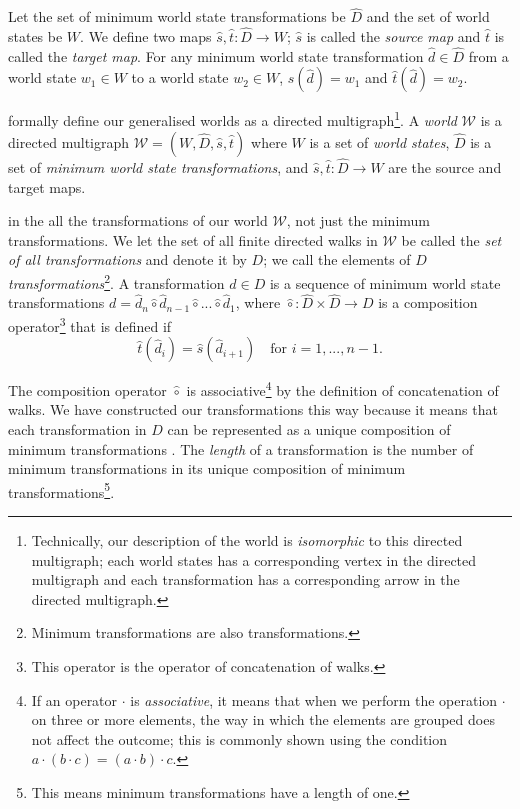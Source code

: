 Let the set of minimum world state transformations be $\hat{D}$ and the set of world states be $W$.
We define two maps $\hat{s},\hat{t}: \hat{D} \to W$; $\hat{s}$ is called the \emph{source map} and $\hat{t}$ is called the \emph{target map}.
For any minimum world state transformation $\hat{d} \in \hat{D}$ from a world state $w_{1} \in W$ to a world state $w_{2} \in W$, $\hat{s}(\hat{d}) = w_{1}$ and $\hat{t}(\hat{d}) = w_{2}$.

 formally define our generalised worlds as a directed multigraph\footnote{Technically, our description of the world is \textit{isomorphic} to this directed multigraph; each world states has a corresponding vertex in the directed multigraph and each transformation has a corresponding arrow in the directed multigraph.}.
A \emph{world} $\mathscr{W}$ is a directed multigraph $\mathscr{W} = (W, \hat{D}, \hat{s}, \hat{t})$ where $W$ is a set of \emph{world states}, $\hat{D}$ is a set of \emph{minimum world state transformations}, and $\hat{s},\hat{t}: \hat{D} \to W$ are the source and target maps.

 in the all the transformations of our world $\mathscr{W}$, not just the minimum transformations.
We let the set of all finite directed walks in $\mathscr{W}$ be called the \emph{set of all transformations} and denote it by $D$; we call the elements of $D$ \emph{transformations}\footnote{Minimum transformations are also transformations.}.
A transformation $d \in D$ is a sequence of minimum world state transformations $d = \hat{d}_{n} \hat{\circ} \hat{d}_{n-1} \hat{\circ} ... \hat{\circ} \hat{d}_{1}$, where $\hat{\circ}: \hat{D} \times \hat{D} \to D$ is a composition operator\footnote{This operator is the operator of concatenation of walks.} that is defined if 
\begin{equation}
    \hat{t}(\hat{d}_{i}) = \hat{s}(\hat{d}_{i+1}) \quad \text{for $i = 1, ..., n-1$.}
\end{equation}

The composition operator $\hat{\circ}$ is associative\footnote{If an operator $\cdot$ is \emph{associative}, it means that when we perform the operation $\cdot$ on three or more elements, the way in which the elements are grouped does not affect the outcome; this is commonly shown using the condition $a \cdot (b \cdot c) = (a \cdot b) \cdot c$.} by the definition of concatenation of walks.
We have constructed our transformations this way because it means that each transformation in $D$ can be represented as a unique composition of minimum transformations .
The \emph{length} of a transformation is the number of minimum transformations in its unique composition of minimum transformations\footnote{This means minimum transformations have a length of one.}.

